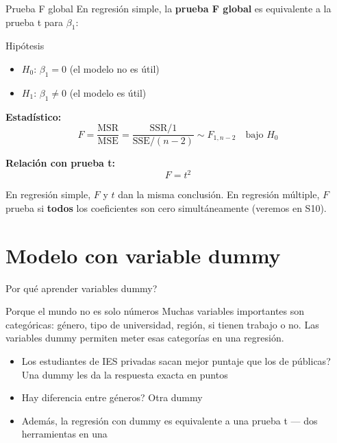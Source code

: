 \documentclass[aspectratio=169, 11pt]{beamer}
\begin{document}
\begin{frame}{Prueba F global}
En regresión simple, la \textbf{prueba F global} es equivalente a la prueba t para $\beta_1$:

\begin{block}{Hipótesis}
\begin{itemize}
  \item $H_0$: $\beta_1 = 0$ (el modelo no es útil)
  \item $H_1$: $\beta_1 \neq 0$ (el modelo es útil)
\end{itemize}
\end{block}

\vspace{0.2cm}
\textbf{Estadístico:}
\[
F = \frac{\text{MSR}}{\text{MSE}} = \frac{\text{SSR}/1}{\text{SSE}/(n-2)} \sim F_{1, n-2} \quad \text{bajo } H_0
\]

\vspace{0.2cm}
\textbf{Relación con prueba t:}
\[
F = t^2
\]

En regresión simple, $F$ y $t$ dan la misma conclusión. En regresión múltiple, $F$ prueba si \textbf{todos} los coeficientes son cero simultáneamente (veremos en S10).
\end{frame}

\section{Modelo con variable dummy}

\begin{frame}{\textquestiondown{}Por qu\'e aprender variables dummy?}
\begin{exampleblock}{Porque el mundo no es solo n\'umeros}
\small
Muchas variables importantes son categ\'oricas: g\'enero, tipo de universidad, regi\'on, si tienen trabajo o no. Las variables dummy permiten meter esas categor\'ias en una regresi\'on.
\begin{itemize}\setlength{\itemsep}{2pt}
  \item \textquestiondown{}Los estudiantes de IES privadas sacan mejor puntaje que los de p\'ublicas? Una dummy les da la respuesta exacta en puntos
  \item \textquestiondown{}Hay diferencia entre g\'eneros? Otra dummy
  \item Adem\'as, la regresi\'on con dummy es equivalente a una prueba t --- dos herramientas en una
\end{itemize}
\end{exampleblock}
\end{frame}
\end{document}

